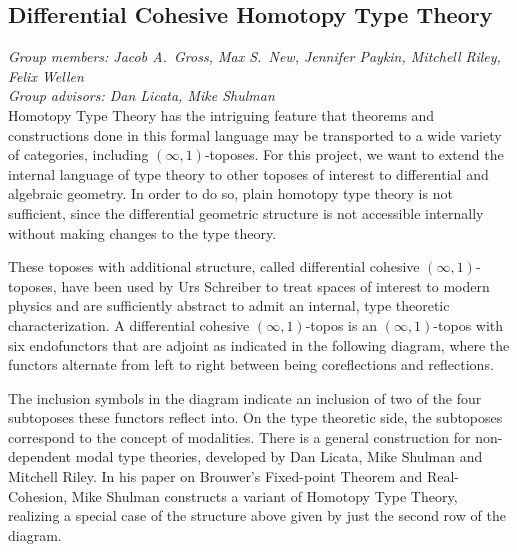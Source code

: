 \documentclass[a4paper,12pt]{article}
\begin{document}
\subsection*{Differential Cohesive Homotopy Type Theory}

\emph{Group members: Jacob A.\ Gross, Max S.\ New, Jennifer Paykin, Mitchell Riley, Felix Wellen} \\
\emph{Group advisors: Dan Licata, Mike Shulman} \\

Homotopy Type Theory has the intriguing feature that theorems and constructions done in this formal language
may be transported to a wide variety of categories, including $(\infty,1)$-toposes.
For this project, we want to extend the internal language of type theory to other toposes of interest to differential and algebraic geometry. In order to do so, plain homotopy type theory is not sufficient, since the differential geometric structure 
is not accessible internally without making changes to the type theory.

These toposes with additional structure, called differential cohesive $(\infty,1)$-toposes, have been used by Urs Schreiber to treat spaces of interest to modern physics
and are sufficiently abstract to admit an internal, type theoretic characterization. 
A differential cohesive $(\infty,1)$-topos is an $(\infty,1)$-topos with six endofunctors that are adjoint as indicated in the following diagram,
where the functors alternate from left to right between being coreflections and reflections.
\begin{center}
\end{center}
The inclusion symbols in the diagram indicate an inclusion of two of the four subtoposes these functors reflect into.
On the type theoretic side, the subtoposes correspond to the concept of modalities.
There is a general construction for non-dependent modal type theories, developed by Dan Licata, Mike Shulman and Mitchell Riley. 
In his paper on Brouwer's Fixed-point Theorem and Real-Cohesion, Mike Shulman constructs a variant of Homotopy Type Theory, 
realizing a special case of the structure above given by just the second row of the diagram.
\end{document}
